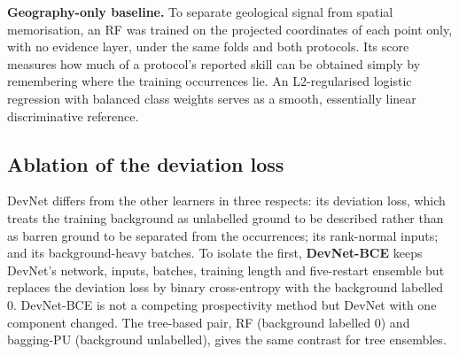\documentclass[pdflatex,sn-apa]{sn-jnl}
\begin{document}
\textbf{Geography-only baseline.} To separate geological signal from spatial memorisation, an RF was trained on the projected coordinates of each point only, with no evidence layer, under the same folds and both protocols. Its score measures how much of a protocol's reported skill can be obtained simply by remembering where the training occurrences lie. An L2-regularised logistic regression with balanced class weights serves as a smooth, essentially linear discriminative reference.

\subsection{Ablation of the deviation loss}\label{sec:ablation-methods}

DevNet differs from the other learners in three respects: its deviation loss, which treats the training background as unlabelled ground to be described rather than as barren ground to be separated from the occurrences; its rank-normal inputs; and its background-heavy batches. To isolate the first, \textbf{DevNet-BCE} keeps DevNet's network, inputs, batches, training length and five-restart ensemble but replaces the deviation loss by binary cross-entropy with the background labelled 0. DevNet-BCE is not a competing prospectivity method but DevNet with one component changed. The tree-based pair, RF (background labelled 0) and bagging-PU (background unlabelled), gives the same contrast for tree ensembles.
\end{document}
